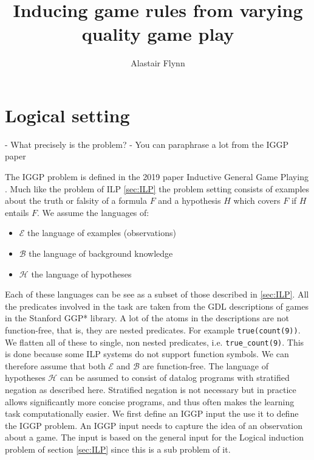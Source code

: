 \documentclass[a4paper,12pt]{report}
\begin{document}
\title{\Large{\textbf{Inducing game rules from varying quality game play}}}
\author{Alastair Flynn}
\maketitle





\chapter{Logical setting}\label{LogicalSetting}
    - What precisely is the problem?
    - You can paraphrase a lot from the IGGP paper

The IGGP problem is defined in the 2019 paper Inductive General Game Playing \cite{Cropper/IGGP}. Much like the problem of ILP \ref{sec:ILP} the problem setting consists of examples about the truth or falsity of a formula $F$ and a hypothesis $H$ which covers $F$ if $H$ entails $F$. We assume the languages of:
\begin{itemize}
\item $\mathscr{E}$ the language of examples (observations)
\item $\mathscr{B}$ the language of background knowledge
\item $\mathscr{H}$ the language of hypotheses
\end{itemize} Each of these languages can be see as a subset of those described in \ref{sec:ILP}. All the predicates involved in the task are taken from the GDL descriptions of games in the Stanford GGP* library. A lot of the atoms in the descriptions are not function-free, that is, they are nested predicates. For example \texttt{true(count(9))}. We flatten all of these to single, non nested predicates, i.e. \texttt{true_count(9)}. This is done because some ILP systems do not support function symbols. We can therefore assume that both $\mathscr{E}$ and $\mathscr{B}$ are function-free. The language of hypotheses $\mathscr{H}$ can be assumed to consist of datalog programs with stratified negation as described here\cite{Kenneth}. Stratified negation is not necessary but in practice allows significantly more concise programs, and thus often makes the learning task computationally easier. We first define an IGGP input the use it to define the IGGP problem. An IGGP input needs to capture the idea of an observation about a game. The input is based on the general input for the Logical induction problem of section \ref{sec:ILP} since this is a sub problem of it.
\end{document}
